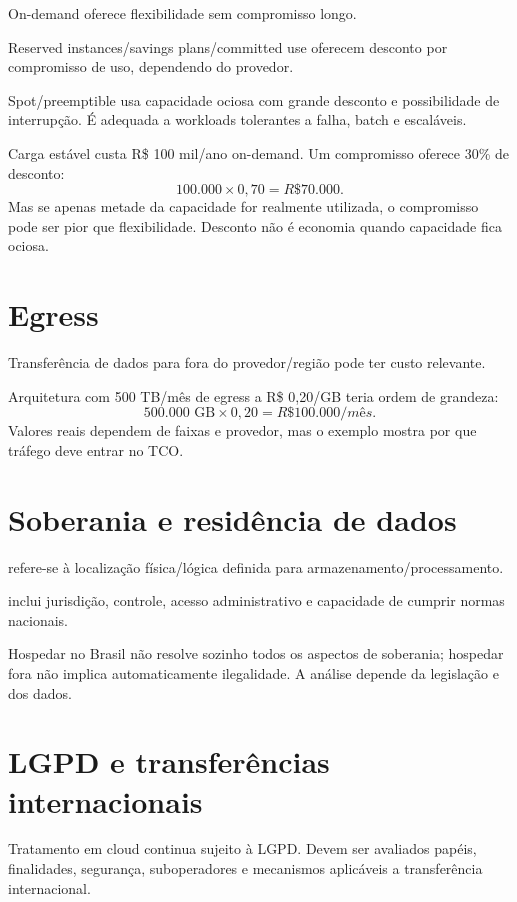 On-demand oferece flexibilidade sem compromisso longo.

Reserved instances/savings plans/committed use oferecem desconto por compromisso de uso, dependendo do provedor.

Spot/preemptible usa capacidade ociosa com grande desconto e possibilidade de interrupção. É adequada a workloads tolerantes a falha, batch e escaláveis.

\begin{example}
Carga estável custa R\$ 100 mil/ano on-demand. Um compromisso oferece 30\% de desconto:
\[
100.000\times0{,}70=R\$70.000.
\]
Mas se apenas metade da capacidade for realmente utilizada, o compromisso pode ser pior que flexibilidade. Desconto não é economia quando capacidade fica ociosa.
\end{example}

\section{Egress}

Transferência de dados para fora do provedor/região pode ter custo relevante.

Arquitetura com 500 TB/mês de egress a R\$ 0,20/GB teria ordem de grandeza:
\[
500.000\text{ GB}\times0{,}20=R\$100.000/mês.
\]
Valores reais dependem de faixas e provedor, mas o exemplo mostra por que tráfego deve entrar no TCO.

\section{Soberania e residência de dados}

 refere-se à localização física/lógica definida para armazenamento/processamento.

 inclui jurisdição, controle, acesso administrativo e capacidade de cumprir normas nacionais.

Hospedar no Brasil não resolve sozinho todos os aspectos de soberania; hospedar fora não implica automaticamente ilegalidade. A análise depende da legislação e dos dados.

\section{LGPD e transferências internacionais}

Tratamento em cloud continua sujeito à LGPD. Devem ser avaliados papéis, finalidades, segurança, suboperadores e mecanismos aplicáveis a transferência internacional.

